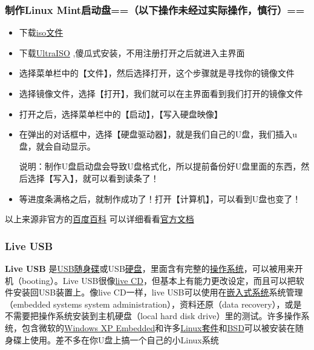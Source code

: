 \documentclass[
]{book}
\begin{document}
\hypertarget{ux5236ux4f5clinux-mintux542fux52a8ux76d8ux4ee5ux4e0bux64cdux4f5cux672aux7ecfux8fc7ux5b9eux9645ux64cdux4f5cux614eux884c}{%
\subsubsection{制作Linux Mint启动盘==（以下操作未经过实际操作，慎行）==}\label{ux5236ux4f5clinux-mintux542fux52a8ux76d8ux4ee5ux4e0bux64cdux4f5cux672aux7ecfux8fc7ux5b9eux9645ux64cdux4f5cux614eux884c}}

\begin{itemize}
\item
  下载\href{https://www.linuxmint.com/edition.php?id=246}{iso文件}
\item
  下载\href{https://www.ultraiso.com/}{UltraISO} ,傻瓜式安装，不用注册打开之后就进入主界面
\item
  选择菜单栏中的【文件】，然后选择打开，这个步骤就是寻找你的镜像文件
\item
  选择镜像文件，选择【打开】，我们就可以在主界面看到我们打开的镜像文件
\item
  打开之后，选择菜单栏中的【启动】，【写入硬盘映像】
\item
  在弹出的对话框中，选择【硬盘驱动器】，就是我们自己的U盘，我们插入u盘，就会自动显示。

  说明：制作U盘启动盘会导致U盘格式化，所以提前备份好U盘里面的东西，然后选择【写入】，就可以看到读条了！
\item
  等进度条满格之后，就制作成功了！打开【计算机】，可以看到U盘也变了！
\end{itemize}

以上来源非官方的\href{https://jingyan.baidu.com/article/4b07be3c497b4648b280f36f.html}{百度百科} 可以详细看看\href{https://ubuntu.com/tutorials/create-a-usb-stick-on-ubuntu\#2-requirements}{官方文档}

\hypertarget{live-usb}{%
\subsubsection{Live USB}\label{live-usb}}

\textbf{Live USB} 是\href{https://zh.wikipedia.org/wiki/USB}{USB}\href{https://zh.wikipedia.org/wiki/隨身碟}{随身碟}或USB\href{https://zh.wikipedia.org/wiki/硬碟}{硬盘}，里面含有完整的\href{https://zh.wikipedia.org/wiki/作業系統}{操作系统}，可以被用来开机（booting）。Live USB很像\href{https://zh.wikipedia.org/wiki/Live_CD}{live CD}，但基本上有能力更改设定，而且可以把软件安装回USB装置上。像live CD一样，live USB可以使用在\href{https://zh.wikipedia.org/wiki/嵌入式系统}{嵌入式系统}系统管理（embedded systems system administration），资料还原（data recovery），或是不需要把操作系统安装到主机硬盘（local hard disk drive）里的测试。许多操作系统，包含微软的\href{https://zh.wikipedia.org/wiki/Windows_XP_Embedded}{Windows XP Embedded}和许多\href{https://zh.wikipedia.org/wiki/Linux套件}{Linux套件}和\href{https://zh.wikipedia.org/wiki/BSD}{BSD}可以被安装在随身碟上使用。差不多在你U盘上搞一个自己的小Linux系统

  
\end{document}
